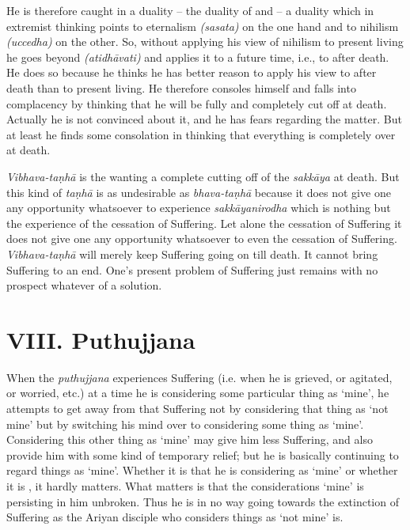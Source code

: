 He is therefore caught in a duality -- the duality of  and  -- a duality which in extremist thinking points to eternalism \emph{(sasata)} on the one hand and to nihilism \emph{(uccedha)} on the other. So, without applying his view of nihilism to present living he goes beyond \emph{(atidhāvati)} and applies it to a future time, i.e., to after death. He does so because he thinks he has better reason to apply his view to after death than to present living. He therefore consoles himself and falls into complacency by thinking that he will be fully and completely cut off at death. Actually he is not convinced about it, and he has fears regarding the matter. But at least he finds some consolation in thinking that everything is completely over at death.

\emph{Vibhava-taṇhā} is the wanting a complete cutting off of the \emph{sakkāya} at death. But this kind of \emph{taṇhā} is as undesirable as \emph{bhava-taṇhā} because it does not give one any opportunity whatsoever to experience \emph{sakkāyanirodha} which is nothing but the experience of the cessation of Suffering. Let alone  the cessation of Suffering it does not give one any opportunity whatsoever to even  the cessation of Suffering. \emph{Vibhava-taṇhā} will merely keep Suffering going on till death. It cannot bring Suffering to an end. One's present problem of Suffering just remains with no prospect whatever of a solution.

\section{VIII. Puthujjana}

When the \emph{puthujjana} experiences Suffering (i.e. when he is grieved, or agitated, or worried, etc.) at a time he is considering some particular thing as `mine', he attempts to get away from that Suffering not by considering that  thing as `not mine' but by switching his mind over to considering some  thing as `mine'. Considering this other thing as `mine' may give him less Suffering, and also provide him with some kind of temporary relief; but he is basically continuing to regard things as `mine'. Whether it is  that he is considering as `mine' or whether it is , it hardly matters. What matters is that the considerations `mine' is persisting in him unbroken. Thus he is in no way going towards the extinction of Suffering as the Ariyan disciple who considers things as `not mine' is.


